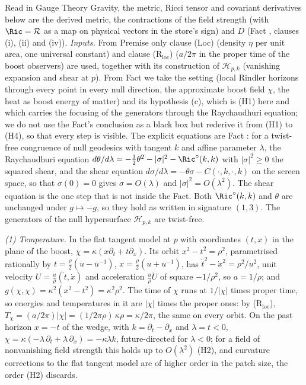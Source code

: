 Read in Gauge Theory Gravity, the metric, Ricci tensor and covariant derivatives below are the derived metric, the contractions of the field strength (with $\Ric = \mathcal{R}$ as a map on physical vectors in the store's sign) and $D$ (Fact , clauses (i), (ii) and (iv)). \emph{Inputs.} From Premise  only clause (Loc) (density $\eta$ per unit area, one universal constant) and clause (R$_{\mathrm{loc}}$) ($a/2\pi$ in the proper time of the boost observers) are used, together with its construction of $\mathcal{H}_{p,k}$ (vanishing expansion and shear at $p$). From Fact  we take the setting (local Rindler horizons through every point in every null direction, the approximate boost field $\chi$, the heat as boost energy of matter) and its hypothesis (c), which is (H1) here and which carries the focusing of the generators through the Raychaudhuri equation; we do not use the Fact's conclusion as a black box but rederive it from (H1) to (H4), so that every step is visible. The explicit equations are Fact : for a twist-free congruence of null geodesics with tangent $k$ and affine parameter $\lambda$, the Raychaudhuri equation $d\theta/d\lambda = -\tfrac12\theta^{2} - |\sigma|^{2} - \Ric^{\circ}(k,k)$ with $|\sigma|^{2} \geq 0$ the squared shear, and the shear equation $d\sigma/d\lambda = -\theta\sigma - C(\cdot,k,\cdot,k)$ on the screen space, so that $\sigma(0) = 0$ gives $\sigma = O(\lambda)$ and $|\sigma|^{2} = O(\lambda^{2})$. The shear equation is the one step that is not inside the Fact. Both $\Ric^{\circ}(k,k)$ and $\theta$ are unchanged under $g \mapsto -g$, so they hold as written in signature $(1,3)$. The generators of the null hypersurface $\mathcal{H}_{p,k}$ are twist-free.

\emph{(1) Temperature.} In the flat tangent model at $p$ with coordinates $(t,x)$ in the plane of the boost, $\chi = \kappa(x\partial_{t} + t\partial_{x})$. Its orbit $x^{2} - t^{2} = \rho^{2}$, parametrised rationally by $t = \tfrac{\rho}{2}(u - u^{-1})$, $x = \tfrac{\rho}{2}(u + u^{-1})$, has $\dot t^{2} - \dot x^{2} = \rho^{2}/u^{2}$, unit velocity $U = \tfrac{u}{\rho}(\dot t, \dot x)$ and acceleration $\tfrac{u}{\rho}\dot U$ of square $-1/\rho^{2}$, so $a = 1/\rho$; and $g(\chi,\chi) = \kappa^{2}(x^{2} - t^{2}) = \kappa^{2}\rho^{2}$. The time of $\chi$ runs at $1/|\chi|$ times proper time, so energies and temperatures in it are $|\chi|$ times the proper ones: by (R$_{\mathrm{loc}}$), $T_{\chi} = (a/2\pi)|\chi| = (1/2\pi\rho)\,\kappa\rho = \kappa/2\pi$, the same on every orbit. On the past horizon $x = -t$ of the wedge, with $k = \partial_{t} - \partial_{x}$ and $\lambda = t < 0$, $\chi = \kappa(-\lambda\,\partial_{t} + \lambda\,\partial_{x}) = -\kappa\lambda k$, future-directed for $\lambda < 0$; for a field of nonvanishing field strength this holds up to $O(\lambda^{2})$ (H2), and curvature corrections to the flat tangent model are of higher order in the patch size, the order (H2) discards.

